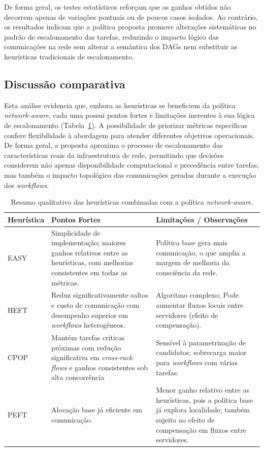 \documentclass[12pt]{article}
\begin{document}
De forma geral, os testes estatísticos reforçam que os ganhos obtidos não decorrem apenas de variações pontuais ou de poucos casos isolados. 
%
Ao contrário, os resultados indicam que a política proposta promove alterações sistemáticas no padrão de escalonamento das tarefas, reduzindo o impacto lógico das comunicações na rede sem alterar a semântica dos DAGs nem substituir as heurísticas tradicionais de escalonamento.

\subsection{Discussão comparativa}
\label{subsec:discussao_comparativa}

Esta análise evidencia que, embora as heurísticas se beneficiem da política \textit{network-aware}, cada uma possui pontos fortes e limitações inerentes à sua lógica de escalonamento (Tabela~\ref{tab:heuristicas_com_network}). 
%
A possibilidade de priorizar métricas específicas confere flexibilidade à abordagem para atender diferentes objetivos operacionais.
%
De forma geral, a proposta aproxima o processo de escalonamento das características reais da infraestrutura de rede, permitindo que decisões considerem não apenas disponibilidade computacional e precedência entre tarefas, mas também o impacto topológico das comunicações geradas durante a execução dos \textit{workflows}. 

\begin{table}[h!]
\scriptsize
\centering
\caption{Resumo qualitativo das heurísticas combinadas com a política \textit{network-aware}.}
\label{tab:heuristicas_com_network}
\begin{tabular}{l p{5cm} p{7.5cm}}
\toprule
\textbf{Heurística} & \textbf{Pontos Fortes} & \textbf{Limitações / Observações} \\
\midrule
EASY & {\raggedright Simplicidade de implementação; maiores ganhos relativos entre as heurísticas, com melhorias consistentes em todas as métricas.} & {\raggedright Política base gera mais comunicação, o que amplia a margem de melhoria da consciência da rede.} \\
\midrule
HEFT & {\raggedright Reduz significativamente saltos e custo de comunicação com desempenho superior em \textit{workflows} heterogêneos.} & {\raggedright Algoritmo complexo; Pode aumentar fluxos locais entre servidores (efeito de compensação).} \\
\midrule
CPOP & {\raggedright Mantém tarefas críticas próximas com redução significativa em \textit{cross-rack flows} e ganhos consistentes sob alta concorrência} & {\raggedright Sensível à parametrização de candidatos; sobrecarga maior para \textit{workflows} com várias tarefas.} \\
\midrule
PEFT & {\raggedright Alocação base já eficiente em comunicação.} & {\raggedright Menor ganho relativo entre as heurísticas, pois a política base já explora localidade; também sujeita ao efeito de compensação em fluxos entre servidores.} \\
\bottomrule
\end{tabular}
\end{table}
\end{document}
